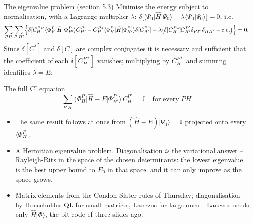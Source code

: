 \documentclass[aspectratio=169,10pt]{beamer}
\newcommand{\ket}[1]{\vert #1\rangle}
\newcommand{\bra}[1]{\langle #1\vert}
\newcommand{\braket}[2]{\langle #1\vert #2\rangle}
\begin{document}
\begin{frame}{The eigenvalue problem (section 5.3)}
  \footnotesize
  Minimise the energy subject to normalisation, with a Lagrange multiplier $\lambda$: $\delta\bigl[\bra{\Psi_0}\hat{H}\ket{\Psi_0}-\lambda\braket{\Psi_0}{\Psi_0}\bigr]=0$, i.e.
  \[
    \sum_{PH}\sum_{P'H'}\Bigl\{\delta[C_H^{P*}]\bra{\Phi_H^P}\hat{H}\ket{\Phi_{H'}^{P'}}C_{H'}^{P'}
    +C_H^{P*}\bra{\Phi_H^P}\hat{H}\ket{\Phi_{H'}^{P'}}\delta[C_{H'}^{P'}]
    -\lambda\bigl(\delta[C_H^{P*}]C_{H'}^{P'}\delta_{PP'}\delta_{HH'}+\mathrm{c.c.}\bigr)\Bigr\}=0 .
  \]
  Since $\delta[C^{*}]$ and $\delta[C]$ are complex conjugates it is necessary and sufficient that the coefficient of each $\delta[C_H^{P*}]$ vanishes; multiplying by $C_H^{P*}$ and summing identifies $\lambda=E$:
  \begin{block}{The full CI equation}
    \[
      \boxed{\;\sum_{P'H'}\bra{\Phi_H^P}\hat{H}-E\ket{\Phi_{H'}^{P'}}\,C_{H'}^{P'}=0\quad\text{for every }PH\;}
    \]
  \end{block}
  \begin{itemize}
    \item The same result follows at once from $(\hat{H}-E)\ket{\Psi_0}=0$ projected onto every $\bra{\Phi_H^P}$.
    \item A Hermitian eigenvalue problem. Diagonalisation \emph{is} the variational answer -- Rayleigh-Ritz in the space of the chosen determinants: the lowest eigenvalue is the best upper bound to $E_0$ in that space, and it can only improve as the space grows.
    \item Matrix elements from the Condon-Slater rules of Thursday; diagonalisation by Householder-QL for small matrices, Lanczos for large ones -- Lanczos needs only $\hat{H}\ket{\Phi}$, the bit code of three slides ago.
  \end{itemize}
\end{frame}
\end{document}

